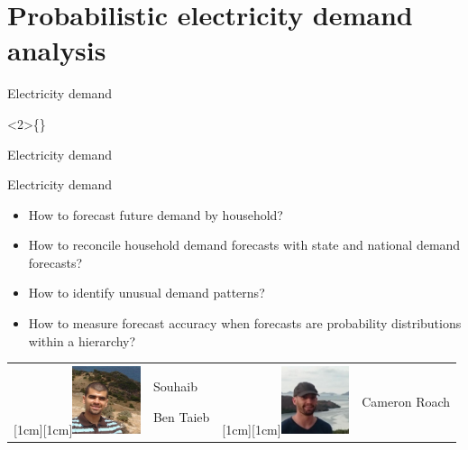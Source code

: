 \documentclass[14pt]{beamer}
\begin{document}
\section{Probabilistic electricity demand analysis}

\begin{frame}{Electricity demand}


\only\textless{}2\textgreater{}\{\}

\end{frame}

\begin{frame}{Electricity demand}


\end{frame}

\begin{frame}{Electricity demand}
\fontsize{14}{16}\sf
\begin{itemize}
\item
  How to forecast future demand by household?
\item
  How to reconcile household demand forecasts with state and national
  demand forecasts?
\item
  How to identify unusual demand patterns?
\item
  How to measure forecast accuracy when forecasts are probability
  distributions within a hierarchy?
\end{itemize}

\pause\vspace*{0.4cm}

\begin{block}{}\fontsize{11}{11}\sf
\hspace*{1cm}\begin{tabular}{p{2.2cm}p{1.8cm}p{2.2cm}p{1.8cm}}
\raisebox{-1cm}[1cm][1cm]{\includegraphics[height=2cm]{figs/souhaib}} & Souhaib\par Ben Taieb &
\raisebox{-1cm}[1cm][1cm]{\includegraphics[height=2cm]{figs/cameron}}  & Cameron Roach
\end{tabular}
\end{block}

\end{frame}
\end{document}
